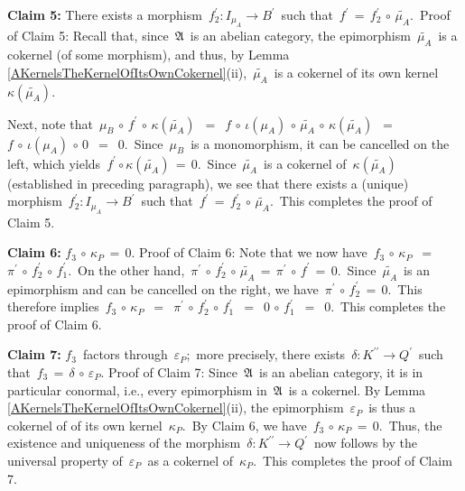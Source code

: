 \begin{enumerate}
	\vskip 0.3cm
	\textbf{Claim 5:}\;
	There exists a morphism
	\,$f_{2}^{\prime} : I_{\mu_{A}} \longrightarrow B^{\prime}$\,
	such that
	\,$f^{\prime} \,=\, f_{2}^{\prime} \,\circ\, \widetilde{\mu_{A}}$.\,
	\vskip 0.01cm
	Proof of Claim 5:\;
	Recall that, since \,$\mathfrak{A}$\, is an abelian category,
	the epimorphism \,$\widetilde{\mu_{A}}$\, is a cokernel (of some morphism),
	and thus, by Lemma \ref{AKernelsTheKernelOfItsOwnCokernel}(ii),
	\,$\widetilde{\mu_{A}}$\, is a cokernel of its own kernel
	\,$\kappa(\widetilde{\mu_{A}})$.

	Next, note that
	\,$\mu_{B} \,\circ\, f^{\prime} \,\circ\, \kappa(\widetilde{\mu_{A}})$
	\,$=$\, $f \,\circ\, \iota(\mu_{A}) \,\circ\, \widetilde{\mu_{A}} \,\circ\, \kappa(\widetilde{\mu_{A}})$
	\,$=$\, $f \,\circ\, \iota(\mu_{A}) \,\circ\, 0$
	\,$=$\, $0$.\,
	Since \,$\mu_{B}$\, is a monomorphism, it can be cancelled on the left,
	which yields
	\,$ f^{\prime} \circ \kappa(\widetilde{\mu_{A}}) \,=\, 0$.\,
	Since \,$\widetilde{\mu_{A}}$\, is a cokernel of \,$\kappa(\widetilde{\mu_{A}})$\, (established in preceding paragraph),
	we see that there exists a (unique) morphism
	\,$f_{2}^{\prime} : I_{\mu_{A}} \longrightarrow B^{\prime}$\,
	such that
	\,$f^{\prime} \,=\, f_{2}^{\prime} \,\circ\, \widetilde{\mu_{A}}$.\,
	This completes the proof of Claim 5.
	

	\vskip 0.3cm
	\textbf{Claim 6:} \;$f_{3} \,\circ\, \kappa_{P} \,=\, 0$.
		\vskip 0.01cm
	Proof of Claim 6:\;
	Note that we now have
	\,$f_{3} \,\circ\, \kappa_{P}$
	\,$=$\, $\pi^{\prime} \,\circ\, f_{2}^{\prime} \,\circ\, f_{1}^{\prime}$.\,
	On the other hand,
	\,$\pi^{\prime} \,\circ\, f_{2}^{\prime} \,\circ\, \widetilde{\mu_{A}} \,=\, \pi^{\prime} \,\circ\, f^{\prime} \,=\, 0$.\,
	Since \,$\widetilde{\mu_{A}}$\, is an epimorphism and can be cancelled on the right,
	we have
	\,$\pi^{\prime} \,\circ\, f_{2}^{\prime} \,=\, 0$.\,
	This therefore implies
	\,$f_{3} \,\circ\, \kappa_{P}$
	\,$=$\, $\pi^{\prime} \,\circ\, f_{2}^{\prime} \,\circ\, f_{1}^{\prime}$
	\,$=$\, $0 \,\circ\, f_{1}^{\prime}$
	\,$=$\, $0$.\,
	This completes the proof of Claim 6.


	\vskip 0.3cm
	\textbf{Claim 7:} \;$f_{3}$\, factors through \,$\varepsilon_{P}$;\,
	more precisely, there exists
	\,$\delta : K^{\prime\prime} \longrightarrow Q^{\prime}$\,
	such that
	\,$f_{3} \,=\, \delta \,\circ\, \varepsilon_{P}$.
	\vskip 0.01cm
	Proof of Claim 7:\;
	Since \,$\mathfrak{A}$\, is an abelian category, it is in particular conormal, i.e.,
	every epimorphism in \,$\mathfrak{A}$\, is a cokernel.
	By Lemma \ref{AKernelsTheKernelOfItsOwnCokernel}(ii),
	the epimorphism \,$\varepsilon_{P}$\, is thus a cokernel of of its own kernel \,$\kappa_{P}$.\,
	By Claim 6, we have \,$f_{3} \,\circ\, \kappa_{P} \,=\, 0$.\,
	Thus, the existence and uniqueness of the morphism
	\,$\delta : K^{\prime\prime} \longrightarrow Q^{\prime}$\,
	now follows by the universal property of
	\,$\varepsilon_{P}$\, as a cokernel of \,$\kappa_{P}$.\,
	This completes the proof of Claim 7.



\end{enumerate}
